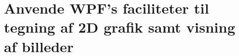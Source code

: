\section{Anvende WPF's faciliteter til tegning af 2D grafik samt visning af billeder}\label{sec:spm4}